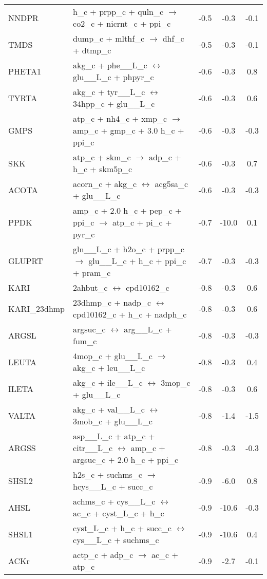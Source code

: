 \begin{longtable}{lp{}ccc}
NNDPR	&	h\_c + prpp\_c + quln\_c $\rightarrow$ co2\_c + nicrnt\_c + ppi\_c	&	-0.5	&	-0.3	&	-0.1	\\
TMDS	&	dump\_c + mlthf\_c $\rightarrow$ dhf\_c + dtmp\_c	&	-0.5	&	-0.3	&	-0.1	\\
PHETA1	&	akg\_c + phe\_\_L\_c $\leftrightarrow$ glu\_\_L\_c + phpyr\_c	&	-0.6	&	-0.3	&	0.8	\\
TYRTA	&	akg\_c + tyr\_\_L\_c $\leftrightarrow$ 34hpp\_c + glu\_\_L\_c	&	-0.6	&	-0.3	&	0.6	\\
GMPS	&	atp\_c + nh4\_c + xmp\_c $\rightarrow$ amp\_c + gmp\_c + 3.0 h\_c + ppi\_c	&	-0.6	&	-0.3	&	-0.3	\\
SKK	&	atp\_c + skm\_c $\rightarrow$ adp\_c + h\_c + skm5p\_c	&	-0.6	&	-0.3	&	0.7	\\
ACOTA	&	acorn\_c + akg\_c $\leftrightarrow$ acg5sa\_c + glu\_\_L\_c	&	-0.6	&	-0.3	&	-0.3	\\
PPDK	&	amp\_c + 2.0 h\_c + pep\_c + ppi\_c $\rightarrow$ atp\_c + pi\_c + pyr\_c	&	-0.7	&	-10.0	&	0.1	\\
GLUPRT	&	gln\_\_L\_c + h2o\_c + prpp\_c $\rightarrow$ glu\_\_L\_c + h\_c + ppi\_c + pram\_c	&	-0.7	&	-0.3	&	-0.3	\\
KARI	&	2ahbut\_c $\leftrightarrow$ cpd10162\_c	&	-0.8	&	-0.3	&	0.6	\\
KARI\_23dhmp	&	23dhmp\_c + nadp\_c $\leftrightarrow$ cpd10162\_c + h\_c + nadph\_c	&	-0.8	&	-0.3	&	0.6	\\
ARGSL	&	argsuc\_c $\leftrightarrow$ arg\_\_L\_c + fum\_c	&	-0.8	&	-0.3	&	-0.3	\\
LEUTA	&	4mop\_c + glu\_\_L\_c $\rightarrow$ akg\_c + leu\_\_L\_c	&	-0.8	&	-0.3	&	0.4	\\
ILETA	&	akg\_c + ile\_\_L\_c $\leftrightarrow$ 3mop\_c + glu\_\_L\_c	&	-0.8	&	-0.3	&	0.6	\\
VALTA	&	akg\_c + val\_\_L\_c $\leftrightarrow$ 3mob\_c + glu\_\_L\_c	&	-0.8	&	-1.4	&	-1.5	\\
ARGSS	&	asp\_\_L\_c + atp\_c + citr\_\_L\_c $\leftrightarrow$ amp\_c + argsuc\_c + 2.0 h\_c + ppi\_c	&	-0.8	&	-0.3	&	-0.3	\\
SHSL2	&	h2s\_c + suchms\_c $\rightarrow$ hcys\_\_L\_c + succ\_c	&	-0.9	&	-6.0	&	0.8	\\
AHSL	&	achms\_c + cys\_\_L\_c $\leftrightarrow$ ac\_c + cyst\_L\_c + h\_c	&	-0.9	&	-10.6	&	-0.3	\\
SHSL1	&	cyst\_L\_c + h\_c + succ\_c $\leftrightarrow$ cys\_\_L\_c + suchms\_c	&	-0.9	&	-10.6	&	0.4	\\
ACKr	&	actp\_c + adp\_c $\rightarrow$ ac\_c + atp\_c	&	-0.9	&	-2.7	&	-0.1	\\

\end{longtable}

